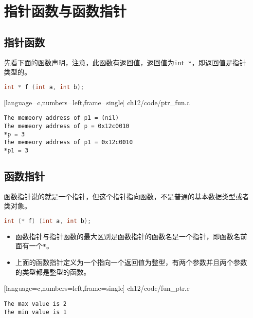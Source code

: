 \section{指针函数与函数指针}

\subsection{指针函数}
\begin{frame}[fragile]\ft{\subsecname}
先看下面的函数声明，注意，此函数有返回值，返回值为\verb|int *|，即返回值是指针类型的。
  \begin{lstlisting}[language=c,backgroundcolor=\color{red!20}]
int * f (int a, int b);    
  \end{lstlisting}
\end{frame}


\begin{frame}\ft{\subsecname}

[language=c,numbers=left,frame=single]
{ch12/code/ptr_fun.c}
\end{frame}


\begin{frame}[fragile]\ft{\subsecname}
  \begin{lstlisting}[backgroundcolor=\color{blue!20}]
The memeory address of p1 = (nil) 
The memeory address of p = 0x12c0010 
*p = 3 
The memeory address of p1 = 0x12c0010 
*p1 = 3     
  \end{lstlisting}
\end{frame}


\subsection{函数指针}
\begin{frame}[fragile]\ft{\subsecname}
函数指针说的就是一个指针，但这个指针指向函数，不是普通的基本数据类型或者类对象。
  \begin{lstlisting}[language=c,backgroundcolor=\color{red!20}]
int (* f) (int a, int b);    
  \end{lstlisting}
  \begin{itemize}
  \item
    函数指针与指针函数的最大区别是函数指针的函数名是一个指针，即函数名前面有一个\verb|*|。 
  \item
    上面的函数指针定义为一个指向一个返回值为整型，有两个参数并且两个参数的类型都是整型的函数。
  \end{itemize}
\end{frame}

\begin{frame}\ft{\subsecname}

[language=c,numbers=left,frame=single]
{ch12/code/fun_ptr.c}
\end{frame}


\begin{frame}[fragile]\ft{\subsecname}
  \begin{lstlisting}[backgroundcolor=\color{blue!20}]
The max value is 2 
The min value is 1 
  \end{lstlisting}
\end{frame}
